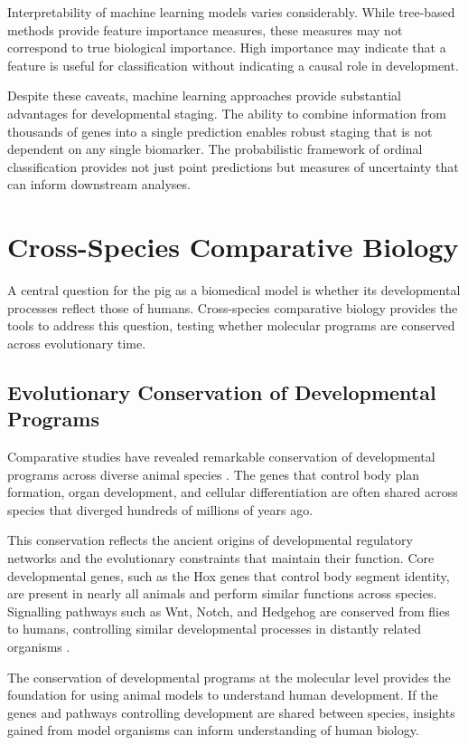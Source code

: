 Interpretability of machine learning models varies considerably. While tree-based methods provide feature importance measures, these measures may not correspond to true biological importance. High importance may indicate that a feature is useful for classification without indicating a causal role in development.

Despite these caveats, machine learning approaches provide substantial advantages for developmental staging. The ability to combine information from thousands of genes into a single prediction enables robust staging that is not dependent on any single biomarker. The probabilistic framework of ordinal classification provides not just point predictions but measures of uncertainty that can inform downstream analyses.


\section{Cross-Species Comparative Biology}\label{sec:lit:comparative}

A central question for the pig as a biomedical model is whether its developmental processes reflect those of humans. Cross-species comparative biology provides the tools to address this question, testing whether molecular programs are conserved across evolutionary time.

\subsection{Evolutionary Conservation of Developmental Programs}

Comparative studies have revealed remarkable conservation of developmental programs across diverse animal species \parencite{cardoso-moreira_gene_2019}. The genes that control body plan formation, organ development, and cellular differentiation are often shared across species that diverged hundreds of millions of years ago.

This conservation reflects the ancient origins of developmental regulatory networks and the evolutionary constraints that maintain their function. Core developmental genes, such as the Hox genes that control body segment identity, are present in nearly all animals and perform similar functions across species. Signalling pathways such as Wnt, Notch, and Hedgehog are conserved from flies to humans, controlling similar developmental processes in distantly related organisms \parencite{qin_canonical_2024}.

The conservation of developmental programs at the molecular level provides the foundation for using animal models to understand human development. If the genes and pathways controlling development are shared between species, insights gained from model organisms can inform understanding of human biology.

